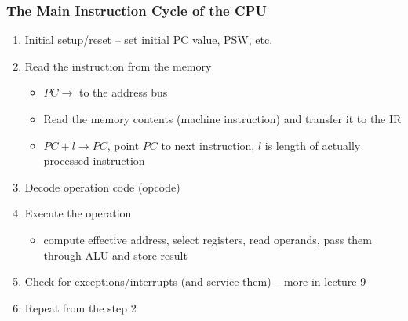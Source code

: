 \documentclass[aspectratio=169]{beamer}
\begin{document}
\begin{frame}
\frametitle{The Main Instruction Cycle of the CPU}
\begin{enumerate}
  \item Initial setup/reset -- set initial PC value, PSW, etc.
  \item Read the instruction from the memory
  \begin{itemize}
    \item $PC \to$ to the address bus
    \item Read the memory contents (machine instruction) and transfer it to the IR
    \item $PC+l \to PC$, point $PC$ to next instruction, $l$ is length of actually processed instruction
  \end{itemize}
  \item Decode operation code (opcode)
  \item Execute the operation
  \begin{itemize}
    \item compute effective address, select registers, read operands, pass them through ALU and store result
  \end{itemize}
  \item Check for exceptions/interrupts (and service them) -- more in lecture 9
  \item Repeat from the step 2
\end{enumerate}
\end{frame}
\end{document}
